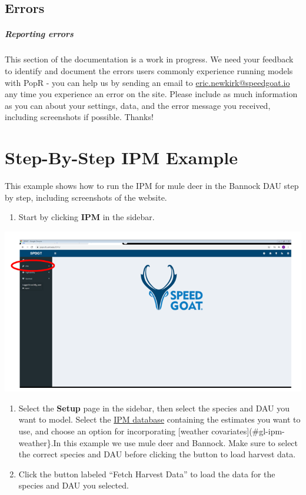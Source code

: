 \documentclass[
]{book}
\providecommand{\tightlist}{%
  \setlength{\itemsep}{0pt}\setlength{\parskip}{0pt}}
\begin{document}
\hypertarget{ipm-errors}{%
\subsection{Errors}\label{ipm-errors}}

\hypertarget{reporting-errors-2}{%
\subparagraph*{Reporting errors}\label{reporting-errors-2}}

This section of the documentation is a work in progress. We need your feedback to identify and document the errors users commonly experience running models with PopR - you can help us by sending an email to \href{mailto:eric.newkirk@speedgoat.io?cc=josh.nowak@speedgoat.io\&subject=PopR\%20Error}{eric.newkirk@speedgoat.io} any time you experience an error on the site. Please include as much information as you can about your settings, data, and the error message you received, including screenshots if possible. Thanks!

\hypertarget{ipm-ex}{%
\section{Step-By-Step IPM Example}\label{ipm-ex}}

This example shows how to run the IPM for mule deer in the Bannock DAU step by step, including screenshots of the website.

\begin{enumerate}
\def\labelenumi{\arabic{enumi}.}
\tightlist
\item
  Start by clicking \textbf{IPM} in the sidebar.
\end{enumerate}

\includegraphics{./www/ipm_01.PNG}

\begin{enumerate}
\def\labelenumi{\arabic{enumi}.}
\setcounter{enumi}{1}
\item
  Select the \textbf{Setup} page in the sidebar, then select the species and DAU you want to model. Select the \protect\hyperlink{gl-ipm-db}{IPM database} containing the estimates you want to use, and choose an option for incorporating {[}weather covariates{]}(\#gl-ipm-weather\}.In this example we use mule deer and Bannock. Make sure to select the correct species and DAU before clicking the button to load harvest data.
\item
  Click the button labeled ``Fetch Harvest Data'' to load the data for the species and DAU you selected.
\end{enumerate}
\end{document}
